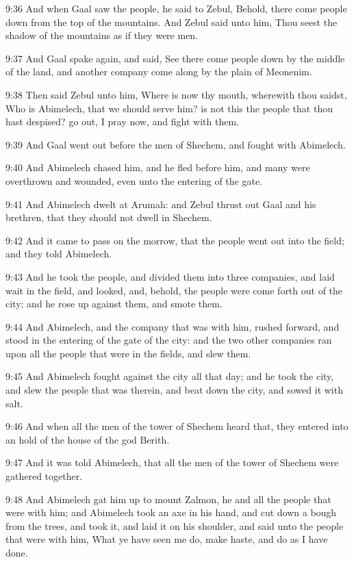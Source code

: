 9:36 And when Gaal saw the people, he said to Zebul, Behold, there
come people down from the top of the mountains. And Zebul said unto
him, Thou seest the shadow of the mountains as if they were men.

9:37 And Gaal spake again, and said, See there come people down by the
middle of the land, and another company come along by the plain of
Meonenim.

9:38 Then said Zebul unto him, Where is now thy mouth, wherewith thou
saidst, Who is Abimelech, that we should serve him? is not this the
people that thou hast despised? go out, I pray now, and fight with
them.

9:39 And Gaal went out before the men of Shechem, and fought with
Abimelech.

9:40 And Abimelech chased him, and he fled before him, and many were
overthrown and wounded, even unto the entering of the gate.

9:41 And Abimelech dwelt at Arumah: and Zebul thrust out Gaal and his
brethren, that they should not dwell in Shechem.

9:42 And it came to pass on the morrow, that the people went out into
the field; and they told Abimelech.

9:43 And he took the people, and divided them into three companies,
and laid wait in the field, and looked, and, behold, the people were
come forth out of the city; and he rose up against them, and smote
them.

9:44 And Abimelech, and the company that was with him, rushed forward,
and stood in the entering of the gate of the city: and the two other
companies ran upon all the people that were in the fields, and slew
them.

9:45 And Abimelech fought against the city all that day; and he took
the city, and slew the people that was therein, and beat down the
city, and sowed it with salt.

9:46 And when all the men of the tower of Shechem heard that, they
entered into an hold of the house of the god Berith.

9:47 And it was told Abimelech, that all the men of the tower of
Shechem were gathered together.

9:48 And Abimelech gat him up to mount Zalmon, he and all the people
that were with him; and Abimelech took an axe in his hand, and cut
down a bough from the trees, and took it, and laid it on his shoulder,
and said unto the people that were with him, What ye have seen me do,
make haste, and do as I have done.


